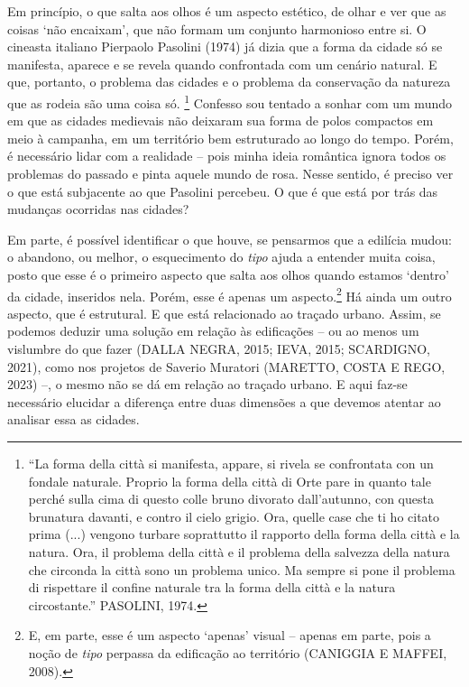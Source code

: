 \documentclass[12pt, a4paper]{book} %
\begin{document}
	        Em princípio, o que salta aos olhos é um aspecto estético, de olhar e ver que as coisas `não encaixam', que não formam um conjunto harmonioso entre si. O cineasta italiano Pierpaolo Pasolini (1974) já dizia que a forma da cidade só se manifesta, aparece e se revela quando confrontada com um cenário natural. E que, portanto, o problema das cidades e o problema da conservação da natureza que as rodeia são uma coisa só.
                \footnote[4]{“La forma della città si manifesta, appare, si rivela se confrontata con un fondale naturale. Proprio la forma della città di Orte pare in quanto tale perché sulla cima di questo colle bruno divorato dall’autunno, con questa brunatura davanti, e contro il cielo grigio. Ora, quelle case che ti ho citato prima (...) vengono turbare soprattutto il rapporto della forma della città e la natura. Ora, il problema della città e il problema della salvezza della natura che circonda la città sono un problema unico. Ma sempre si pone il problema di rispettare il confine naturale tra la forma della città e la natura circostante.” PASOLINI, 1974.} 
            Confesso sou tentado a sonhar com um mundo em que as cidades medievais não deixaram sua forma de polos compactos em meio à campanha, em um território bem estruturado ao longo do tempo. Porém, é necessário lidar com a realidade – pois minha ideia romântica ignora todos os problemas do passado e pinta aquele mundo de rosa.  Nesse sentido, é preciso ver o que está subjacente ao que Pasolini percebeu. O que é que está por trás das mudanças ocorridas nas cidades? 

            Em parte, é possível identificar o que houve, se pensarmos que a edilícia mudou: o abandono, ou melhor, o esquecimento do \textit{tipo} ajuda a entender muita coisa, posto que esse é o primeiro aspecto que salta aos olhos quando estamos `dentro' da cidade, inseridos nela. Porém, esse é apenas um aspecto.\footnote[5]{E, em parte, esse é um aspecto `apenas' visual – apenas em parte, pois a noção de \textit{tipo} perpassa da edificação ao território (CANIGGIA E MAFFEI, 2008). } Há ainda um outro aspecto, que é estrutural. E que está relacionado ao traçado urbano. Assim, se podemos deduzir uma solução em relação às edificações – ou ao menos um vislumbre do que fazer (DALLA NEGRA, 2015; IEVA, 2015; SCARDIGNO, 2021), como nos projetos de Saverio Muratori (MARETTO, COSTA E REGO, 2023) –, o mesmo não se dá em relação ao traçado urbano. E aqui faz-se necessário elucidar a diferença entre duas dimensões a que devemos atentar ao analisar essa as cidades. 
	
\end{document}
